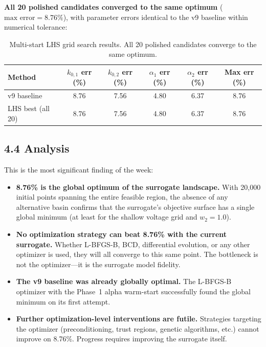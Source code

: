 \documentclass[11pt]{article}
\begin{document}
\textbf{All 20 polished candidates converged to the same optimum}
($\text{max error} = 8.76\%$), with parameter errors identical to the v9
baseline within numerical tolerance:

\begin{table}[H]
  \centering
  \caption{Multi-start LHS grid search results.  All 20 polished candidates
           converge to the same optimum.}
  \label{tab:lhs}
  \begin{tabular}{l S[round-precision=2] S[round-precision=2]
                    S[round-precision=2] S[round-precision=2]
                    S[round-precision=2]}
    \toprule
    Method & {$k_{0,1}$ err (\%)} & {$k_{0,2}$ err (\%)}
           & {$\alpha_1$ err (\%)} & {$\alpha_2$ err (\%)}
           & {Max err (\%)} \\
    \midrule
    v9 baseline       &  8.76 &  7.56 & 4.80 & 6.37 &  8.76 \\
    LHS best (all 20) &  8.76 &  7.56 & 4.80 & 6.37 &  8.76 \\
    \bottomrule
  \end{tabular}
\end{table}

\subsection*{4.4 Analysis}

This is the most significant finding of the week:

\begin{itemize}
  \item \textbf{8.76\% is the global optimum of the surrogate landscape.}
        With 20{,}000 initial points spanning the entire feasible region, the
        absence of any alternative basin confirms that the surrogate's
        objective surface has a single global minimum (at least for the
        shallow voltage grid and $w_2 = 1.0$).

  \item \textbf{No optimization strategy can beat 8.76\% with the current
        surrogate.}  Whether L-BFGS-B, BCD, differential evolution, or any
        other optimizer is used, they will all converge to this same point.
        The bottleneck is not the optimizer---it is the surrogate model
        fidelity.

  \item \textbf{The v9 baseline was already globally optimal.}  The L-BFGS-B
        optimizer with the Phase~1 alpha warm-start successfully found the
        global minimum on its first attempt.

  \item \textbf{Further optimization-level interventions are futile.}
        Strategies targeting the optimizer (preconditioning, trust regions,
        genetic algorithms, etc.) cannot improve on 8.76\%.  Progress requires
        improving the surrogate itself.
\end{itemize}
\end{document}
